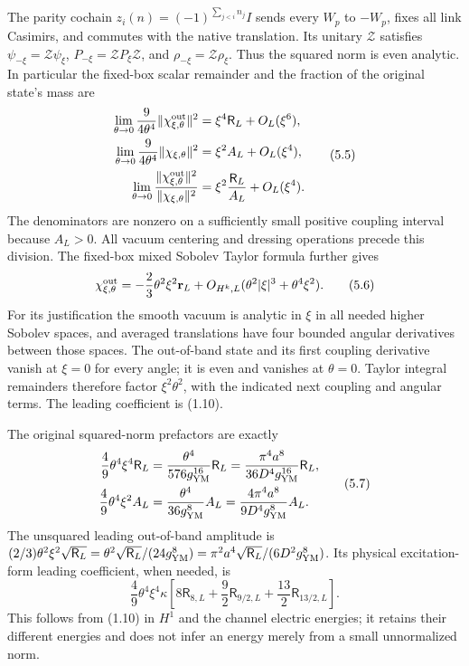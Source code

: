 \documentclass[
  11pt,
]{article}
\begin{document}
The parity cochain \(z_i(n)=(-1)^{\sum_{j<i}n_j}I\) sends every \(W_p\)
to \(-W_p\), fixes all link Casimirs, and commutes with the native
translation. Its unitary \(\mathcal Z\) satisfies
\(\psi_{-\xi}=\mathcal Z\psi_\xi\),
\(P_{-\xi}=\mathcal ZP_\xi\mathcal Z\), and
\(\rho_{-\xi}=\mathcal Z\rho_\xi\). Thus the squared norm is even
analytic. In particular the fixed-box scalar remainder and the fraction
of the original state's mass are \[
\begin{split}
 \lim_{\theta\to0}\frac9{4\theta^4}
               \|\chi^{\rm out}_{\xi,\theta}\|^2
       &=\xi^4\mathsf R_L+O_L(\xi^6),\\
 \lim_{\theta\to0}\frac9{4\theta^4}
               \|\chi_{\xi,\theta}\|^2
       &=\xi^2 A_L+O_L(\xi^4),\\
 \lim_{\theta\to0}
  \frac{\|\chi^{\rm out}_{\xi,\theta}\|^2}{\|\chi_{\xi,\theta}\|^2}
       &=\xi^2\frac{\mathsf R_L}{A_L}+O_L(\xi^4).
\end{split}
\tag{5.5}
\] The denominators are nonzero on a sufficiently small positive
coupling interval because \(A_L>0\). All vacuum centering and dressing
operations precede this division. The fixed-box mixed Sobolev Taylor
formula further gives \[
 \chi^{\rm out}_{\xi,\theta}
 =-\frac23\theta^2\xi^2\mathbf r_L
       +O_{H^k,L}(\theta^2|\xi|^3+\theta^4\xi^2).
\tag{5.6}
\] For its justification the smooth vacuum is analytic in \(\xi\) in all
needed higher Sobolev spaces, and averaged translations have four
bounded angular derivatives between those spaces. The out-of-band state
and its first coupling derivative vanish at \(\xi=0\) for every angle;
it is even and vanishes at \(\theta=0\). Taylor integral remainders
therefore factor \(\xi^2\theta^2\), with the indicated next coupling and
angular terms. The leading coefficient is (1.10).

The original squared-norm prefactors are exactly \[
\begin{split}
 \frac49\theta^4\xi^4\mathsf R_L
   &=\frac{\theta^4}{576g_{\rm YM}^{16}}\mathsf R_L
     =\frac{\pi^4a^8}{36D^4g_{\rm YM}^{16}}\mathsf R_L,\\
 \frac49\theta^4\xi^2 A_L
   &=\frac{\theta^4}{36g_{\rm YM}^{8}}A_L
     =\frac{4\pi^4a^8}{9D^4g_{\rm YM}^{8}}A_L.
\end{split}
\tag{5.7}
\] The unsquared leading out-of-band amplitude is
\((2/3)\theta^2\xi^2\sqrt{\mathsf R_L}
=\theta^2\sqrt{\mathsf R_L}/(24g_{\rm YM}^8)
=\pi^2a^4\sqrt{\mathsf R_L}/(6D^2g_{\rm YM}^8)\). Its physical
excitation-form leading coefficient, when needed, is \[
 \frac49\theta^4\xi^4\kappa
       \left[8\mathsf R_{8,L}
             +\frac92\mathsf R_{9/2,L}
             +\frac{13}2\mathsf R_{13/2,L}\right].
\tag{5.8}
\] This follows from (1.10) in \(H^1\) and the channel electric
energies; it retains their different energies and does not infer an
energy merely from a small unnormalized norm.
\end{document}
